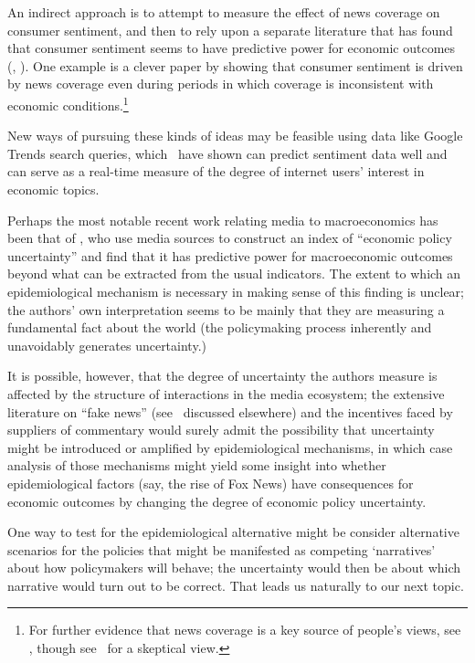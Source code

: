 An indirect approach is to attempt to measure the effect of news coverage on consumer sentiment, and then to rely upon a separate literature that has found that consumer sentiment seems to have predictive power for economic outcomes (\cite{ludvigson2004consumer}, \cite{cfwSentiment}).  One example is a clever paper by \cite{doms2004consumer} showing that consumer sentiment is driven by news coverage even during periods in which coverage is inconsistent with economic conditions.\footnote{For further evidence that news coverage is a key source of people's views, see \cite{lamla2012role}, though see~\cite{pfajfar2013news} for a skeptical view.}

New ways of pursuing these kinds of ideas may be feasible using data like Google Trends search queries, which~\cite{choi2012predicting} have shown can predict sentiment data well and can serve as a real-time measure of the degree of internet users' interest in economic topics.

Perhaps the most notable recent work relating media to macroeconomics has been that of \cite{baker2016measuring}, who use media sources to construct an index of ``economic policy uncertainty'' and find that it has predictive power for macroeconomic outcomes beyond what can be extracted from the usual indicators.  The extent to which an epidemiological mechanism is necessary in making sense of this finding is unclear; the authors' own interpretation seems to be mainly that they are measuring a fundamental fact about the world (the policymaking process inherently and unavoidably generates uncertainty.)

It is possible, however, that the degree of uncertainty the authors measure is affected by the structure of interactions in the media ecosystem; the extensive literature on ``fake news'' (see~\cite{allcott2017social} discussed elsewhere) and the incentives faced by suppliers of commentary would surely admit the possibility that uncertainty might be introduced or amplified by epidemiological mechanisms, in which case analysis of those mechanisms might yield some insight into whether epidemiological factors (say, the rise of Fox News) have consequences for economic outcomes by changing the degree of economic policy uncertainty.

One way to test for the epidemiological alternative might be consider alternative scenarios for the policies that might be manifested as competing `narratives' about how policymakers will behave; the uncertainty would then be about which narrative would turn out to be correct.  That leads us naturally to our next topic.

